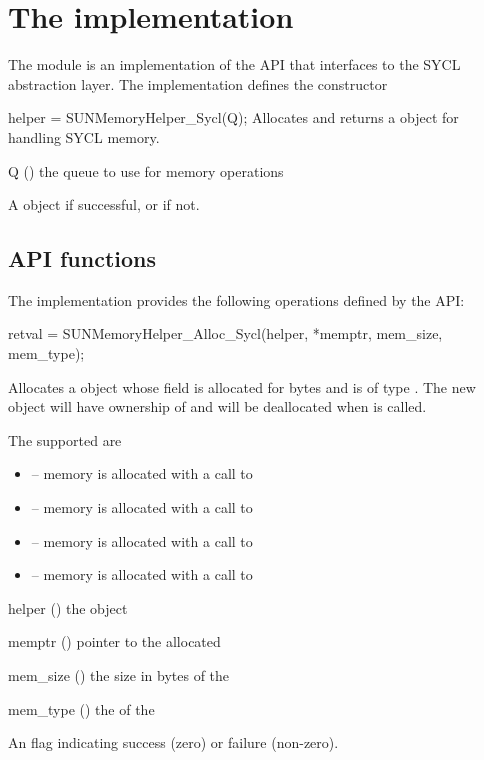 \section{The  implementation}\label{s:sunmemory_sycl}

The  module is an implementation of the  API
that interfaces to the SYCL abstraction layer. The implementation defines
the constructor

{
  helper = SUNMemoryHelper\_Sycl(Q);
}
{
  Allocates and returns a  object for handling SYCL memory.
}
{
  \begin{args}[Q]
  \item[Q] () the queue to use for memory operations
  \end{args}
}
{
  A  object if successful, or  if not.
}
{}


%
%
\subsection{ API functions}\label{ss:sunmemsycl_functions}

The implementation provides the following operations defined by the  API:

{
  retval = SUNMemoryHelper\_Alloc\_Sycl(helper, *memptr, mem\_size, mem\_type);
}
{
  Allocates a  object whose  field is allocated for
   bytes and is of type . The new object will
  have ownership of  and will be deallocated when
   is called.

  The  supported are
  \begin{itemize}
    \item {} -- memory is allocated with a call to 
    \item {} -- memory is allocated with a call to 
    \item {} -- memory is allocated with a call to 
    \item {} -- memory is allocated with a call to 
  \end{itemize}
}
{
  \begin{args}
  \item[helper] () the  object
  \item[memptr] () pointer to the allocated 
  \item[mem\_size] () the size in bytes of the 
  \item[mem\_type] () the  of the 
  \end{args}
}
{
  An  flag indicating success (zero) or failure (non-zero).
}
{}

